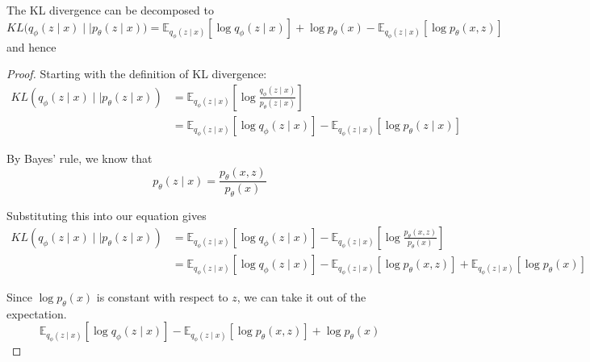 \documentclass{article}
\begin{document}
  \begin{theorem}
    The KL divergence can be decomposed to 
    \begin{equation}
      KL \big( q_\phi (z \mid x) \mid\mid p_{\theta} (z \mid x) \big) = \mathbb{E}_{q_\phi(z \mid x)} [ \log q_{\phi} (z \mid x)] + \log p_{\theta} (x) - \mathbb{E}_{q_{\phi} (z \mid x)} [\log p_{\theta} (x, z)]
    \end{equation}
    and hence 
  \end{theorem}
  \begin{proof}
    Starting with the definition of KL divergence:
    \begin{align}
      KL(q_\phi(z \mid x) \mid\mid p_\theta(z \mid x)) &= \mathbb{E}_{q_\phi(z \mid x)}\left[\log \frac{q_\phi(z \mid x)}{p_\theta(z \mid x)}\right] \\
      &= \mathbb{E}_{q_\phi(z \mid x)}[\log q_\phi(z \mid x)] - \mathbb{E}_{q_\phi(z \mid x)}[\log p_\theta(z \mid x)]
    \end{align}

    By Bayes' rule, we know that
    \begin{equation}
      p_\theta(z \mid x) = \frac{p_\theta(x, z)}{p_\theta(x)}
    \end{equation}

    Substituting this into our equation gives 
    \begin{align}
      KL(q_\phi(z \mid x) \mid\mid p_\theta(z \mid x)) &= \mathbb{E}_{q_\phi(z \mid x)}[\log q_\phi(z \mid x)] - \mathbb{E}_{q_\phi(z \mid x)}\left[\log \frac{p_\theta(x, z)}{p_\theta(x)}\right] \\
      &= \mathbb{E}_{q_\phi(z \mid x)}[\log q_\phi(z \mid x)] - \mathbb{E}_{q_\phi(z \mid x)}[\log p_\theta(x, z)] + \mathbb{E}_{q_\phi(z \mid x)}[\log p_\theta(x)]
    \end{align}

    Since $\log p_\theta(x)$ is constant with respect to $z$, we can take it out of the expectation. 
    \begin{equation}
      \mathbb{E}_{q_\phi(z \mid x)}[\log q_\phi(z \mid x)] - \mathbb{E}_{q_\phi(z \mid x)}[\log p_\theta(x, z)] + \log p_\theta(x)
    \end{equation}
  \end{proof}
\end{document}
